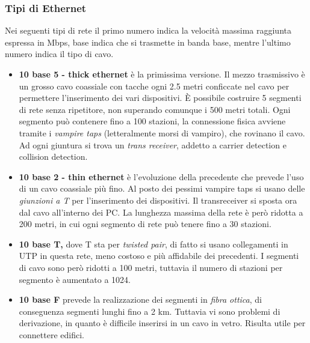 \documentclass[10pt,a4paper,twoside]{article}
\begin{document}
\subsubsection{Tipi di Ethernet}
Nei seguenti tipi di rete il primo numero indica la velocità massima raggiunta espressa in Mbps, base indica che si trasmette in banda base, mentre l'ultimo numero indica il tipo di cavo.
\begin{itemize}
\item \textbf{10 base 5 - thick ethernet} è la primissima versione. Il mezzo trasmissivo è un grosso cavo coassiale con tacche ogni 2.5 metri conficcate nel cavo per permettere l'inserimento dei vari dispositivi. È possibile costruire 5 segmenti di rete senza ripetitore, non superando comunque i 500 metri totali. Ogni segmento può contenere fino a 100 stazioni, la connessione fisica avviene tramite i \textit{vampire taps} (letteralmente morsi di vampiro), che rovinano il cavo.\\
Ad ogni giuntura si trova un \textit{trans receiver}, addetto a carrier detection e collision detection.
\item \textbf{10 base 2 - thin ethernet} è l'evoluzione della precedente che prevede l'uso di un cavo coassiale più fino. Al posto dei pessimi vampire taps si usano delle \textit{giunzioni a T} per l'inserimento dei dispositivi. Il transreceiver si sposta ora dal cavo all'interno dei PC. La lunghezza massima della rete è però ridotta a 200 metri, in cui ogni segmento di rete può tenere fino a 30 stazioni.
\item \textbf{10 base T,} dove T sta per \textit{twisted pair}, di fatto si usano collegamenti in UTP in questa rete, meno costoso e più affidabile dei precedenti. I segmenti di cavo sono però ridotti a 100 metri, tuttavia il numero di stazioni per segmento è aumentato a 1024.
\item \textbf{10 base F} prevede la realizzazione dei segmenti in \textit{fibra ottica}, di conseguenza segmenti lunghi fino a 2 km. Tuttavia vi sono problemi di derivazione, in quanto è difficile inserirsi in un cavo in vetro. Risulta utile per connettere edifici.
\end{itemize}
\end{document}
